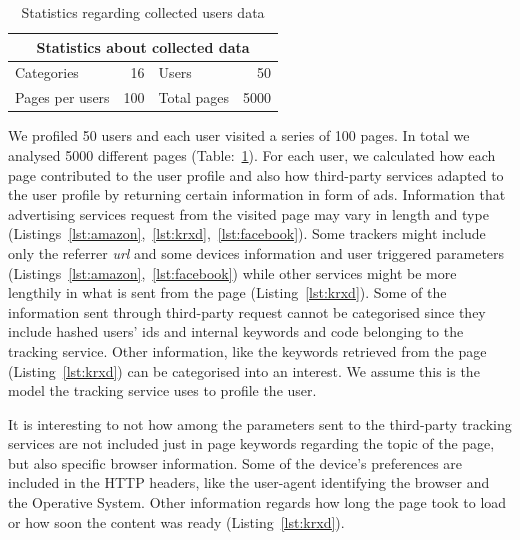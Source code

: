 \begin{table}[htbp]
\centering
\caption{Statistics regarding collected users data \label{table:DatasetStat}}
\def\arraystretch{2.5}
\begin{tabular}{| l | r | l | r | }
\hline
\multicolumn{4}{|c|}{Statistics about collected data}            \\[2.5mm] \hline
Categories               & 16    & Users                   & 50   \\[2.5mm] \hline
Pages per users    & 100 & Total pages      & 5000 \\[2.5mm] \hline
\end{tabular}
\end{table}

We profiled 50 users and each user visited a series of 100 pages. In total we analysed 5000 different pages (Table:~\ref{table:DatasetStat}). For each user, we calculated how each page contributed to the user profile and also how third-party services adapted to the user profile by returning certain information in form of ads. Information that advertising services request from the visited page may vary in length and type (Listings~\ref{lst:amazon},~\ref{lst:krxd},~\ref{lst:facebook}). Some trackers might include only the referrer \emph{url} and some devices information and user triggered parameters (Listings~\ref{lst:amazon},~\ref{lst:facebook}) while other services might be more lengthily in what is sent from the page (Listing~\ref{lst:krxd}). Some of the information sent through third-party request cannot be categorised since they include hashed users' ids and internal keywords and code belonging to the tracking service. Other information, like the keywords retrieved from the page (Listing~\ref{lst:krxd}) can be categorised into an interest. We assume this is the model the tracking service uses to profile the user.

It is interesting to not how among the parameters sent to the third-party tracking services are not included just in page keywords regarding the topic of the page, but also specific browser information. Some of the device's preferences are included in the HTTP headers, like the user-agent identifying the browser and the Operative System. Other information regards how long the page took to load or how soon the content was ready (Listing~\ref{lst:krxd}).

